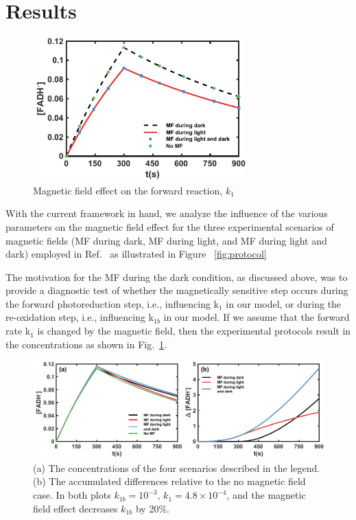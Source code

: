 \documentclass[twoside,twocolumn,9pt]{article}
\begin{document}
\section{Results}
\begin{figure}[h]
	\centering
	\includegraphics[width = \columnwidth, height = 5.53cm]{MfForward.pdf}
	\caption{Magnetic field effect on the forward reaction, $k_{1}$ }
	\label{fig:MfForward}
\end{figure}
With the current framework in hand, we analyze the influence of the various parameters on the magnetic field effect for the three
experimental scenarios of magnetic fields (MF during dark, MF during light, and MF during light and dark) employed in
Ref.~\cite{Pooam2019} as illustrated in Figure ~\ref{fig:protocol}

The motivation for the MF during the dark condition, as discussed above, was to provide a diagnostic test of whether the
magnetically sensitive step occurs during the forward photoreduction step, i.e., influencing k$_{1}$ in our model, or during the
re-oxidation step, i.e., influencing k$_{1b}$ in our model. If we assume that the forward rate k$_{1}$ is changed by the magnetic
field, then the experimental protocols result in the concentrations as shown in Fig.~\ref{fig:MfForward}.
\begin{figure}[h]
	\centering
	\includegraphics{concAndAccDiff.pdf}
	\caption{(a) The concentrations of the four scenarios described in the legend. (b) The accumulated differences relative to the
		no magnetic field case. In both plots $k_{1b} = 10^{-3}$, $k_{1} = 4.8 \times 10^{-4}$, and the magnetic field effect
		decreases $k_{1b}$ by 20\%.}
	\label{fig:concAndAccDiff}
\end{figure}
\end{document}
